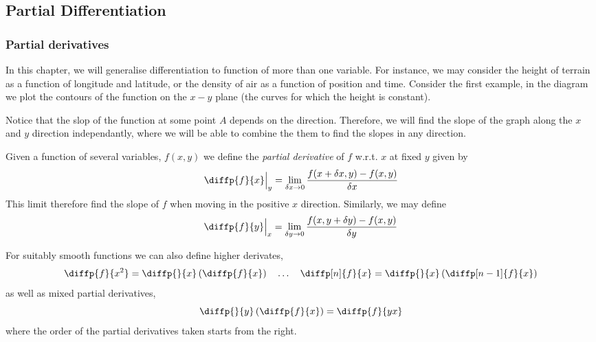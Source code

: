 \documentclass{article}
\begin{document}
\subsection{Partial Differentiation}
\subsubsection{Partial derivatives}
In this chapter, we will generalise differentiation to function of more than one variable. For instance, we may consider the height of terrain as a function of longitude and latitude, or the density of air as a function of position and time. 
Consider the first example, in the diagram we plot the contours of the function on the $x-y$ plane (the curves for which the height is constant).

Notice that the slop of the function at some point $A$ depends on the direction. Therefore, we will find the slope of the graph along the $x$ and $y$ direction independantly, where we will be able to combine the them to find the slopes in any direction.
\begin{defi}
    Given a function of several variables, $f(x, y)$ we define the \emph{partial derivative} of $f$ w.r.t. $x$ at fixed $y$ given by
    \[
        \diffp{f}{x} \Big{|}_{y} = \lim_{\delta x \rightarrow 0}{\frac{f(x + \delta x, y) - f(x, y)}{\delta x}} 
    \]
    This limit therefore find the slope of $f$ when moving in the positive $x$ direction. Similarly, we may define
    \[
        \diffp{f}{y} \Big{|}_{x} = \lim_{\delta y \rightarrow 0}{\frac{f(x, y + \delta y) - f(x, y)}{\delta y}} 
    \]
\end{defi}

\begin{remark}
    For suitably smooth functions we can also define higher derivates,
    \[
        \diffp{f}{{x^2}} = \diffp{}{x}\bkt{\diffp{f}{x}} \quad \ldots \quad \diffp[n]{f}{x} = \diffp{}{x}\bkt{\diffp[n-1]{f}{x}}
    \]
    as well as mixed partial derivatives,
    \[
        \diffp{}{y}\bkt{\diffp{f}{x}} = \diffp{f}{{y}{x}}
    \]
    where the order of the partial derivatives taken starts from the right.
\end{remark}
\end{document}
